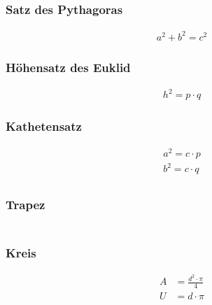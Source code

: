 \subsubsection{Satz des Pythagoras}
\begin{align*}
    a^2+b^2=c^2
\end{align*}

\subsubsection{Höhensatz des Euklid}
\begin{align*}
    h^2=p \cdot q
\end{align*}




\subsubsection{Kathetensatz}
\begin{align*}
    a^2=c \cdot p \\
    b^2=c \cdot q \\
\end{align*}

\subsubsection{Trapez}
\begin{align*}
\end{align*}

\subsubsection{Kreis}
\begin{align*}
    A &= \frac{d^2 \cdot \pi}{4} \\
    U &= d \cdot \pi \\
\end{align*}

